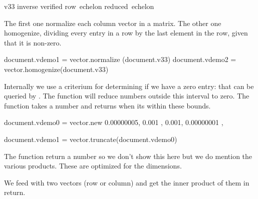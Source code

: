 \startlinecorrection
{}              {\hbox {v33}}
    {}              {\hbox {inverse}}
    {} {\hbox {verified}}
    {}              {\hbox {row echelon}}
    {}              {\hbox {reduced echelon}}
\stopcombination
\stoplinecorrection

The first one normalize each column vector in a matrix. The other one homogenize,
dividing every entry in a row by the last element in the row, given that it is
non-zero.

\startbuffer
\startluacode
document.vdemo1 = vector.normalize (document.v33)
document.vdemo2 = vector.homogenize(document.v33)
\stopluacode
\stopbuffer

\typebuffer[option=TEX] \getbuffer

\startlinecorrection
{} {}
    {} {}
    {} {}
\stopcombination
\stoplinecorrection

Internally we use a criterium for determining if we have a zero entry:
 that can be queried by . The
 function will reduce numbers outside this interval to zero. The
 function takes a number and returns  when its within
these bounds.

\startbuffer
\startluacode
document.vdemo0 = vector.new {
    { 0.00000005, 0.001 },
    { 0.001, 0.00000001 },
}

document.vdemo1 = vector.truncate(document.vdemo0)
\stopluacode
\stopbuffer

\typebuffer[option=TEX] \getbuffer

\startlinecorrection
{} {}
    {} {}
\stopcombination
\stoplinecorrection

The  function return a number so we don't show this here but
we do mention the various products. These are optimized for the dimensions.

We feed  with two vectors (row or column) and get the inner product
of them in return.

